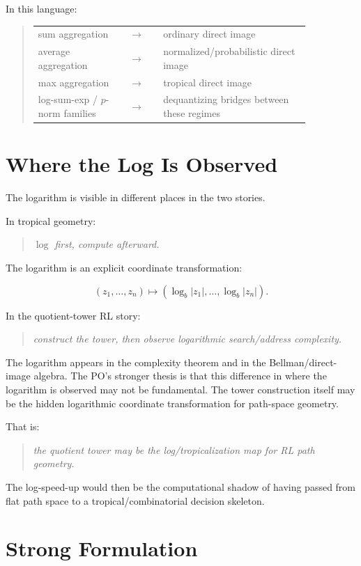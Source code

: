 \documentclass[11pt]{article}
\makeatletter
\newenvironment{claimbox}
  {\begin{quote}\itshape}
  {\end{quote}}
\newenvironment{dictionary}
  {\begin{quote}\begin{tabular}{@{}p{0.30\linewidth}c p{0.54\linewidth}@{}}}
  {\end{tabular}\end{quote}}
\makeatother
\begin{document}
In this language:

\begin{dictionary}
sum aggregation
  & \(\longrightarrow\) &
ordinary direct image \\
average aggregation
  & \(\longrightarrow\) &
normalized/probabilistic direct image \\
max aggregation
  & \(\longrightarrow\) &
tropical direct image \\
log-sum-exp / \(p\)-norm families
  & \(\longrightarrow\) &
dequantizing bridges between these regimes
\end{dictionary}

\section{Where the Log Is Observed}

The logarithm is visible in different places in the two stories.

In tropical geometry:

\begin{claimbox}
\(\log\) first, compute afterward.
\end{claimbox}

The logarithm is an explicit coordinate transformation:

\[
(z_1,\dots,z_n)
\mapsto
(\log_b |z_1|,\dots,\log_b |z_n|).
\]

In the quotient-tower RL story:

\begin{claimbox}
construct the tower, then observe logarithmic search/address complexity.
\end{claimbox}

The logarithm appears in the complexity theorem and in the Bellman/direct-image
algebra. The PO's stronger thesis is that this difference in where the
logarithm is observed may not be fundamental. The tower construction itself may
be the hidden logarithmic coordinate transformation for path-space geometry.

That is:

\begin{claimbox}
the quotient tower may be the log/tropicalization map for RL path geometry.
\end{claimbox}

The log-speed-up would then be the computational shadow of having passed from
flat path space to a tropical/combinatorial decision skeleton.

\section{Strong Formulation}
\end{document}

